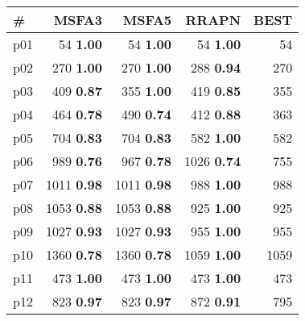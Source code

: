 \begin{tabular}{lrrrr}
\toprule
\textbf{\#} & \textbf{MSFA3} & \textbf{MSFA5} & \textbf{RRAPN} & \textbf{BEST}\\
\midrule
\multicolumn{1}{l|}{p01} & {\footnotesize 54} \textbf{1.00} & {\footnotesize 54} \textbf{1.00} & {\footnotesize 54} \textbf{1.00} & \multicolumn{1}{|r}{54}\\
\multicolumn{1}{l|}{p02} & {\footnotesize 270} \textbf{1.00} & {\footnotesize 270} \textbf{1.00} & {\footnotesize 288} \textbf{0.94} & \multicolumn{1}{|r}{270}\\
\multicolumn{1}{l|}{p03} & {\footnotesize 409} \textbf{0.87} & {\footnotesize 355} \textbf{1.00} & {\footnotesize 419} \textbf{0.85} & \multicolumn{1}{|r}{355}\\
\multicolumn{1}{l|}{p04} & {\footnotesize 464} \textbf{0.78} & {\footnotesize 490} \textbf{0.74} & {\footnotesize 412} \textbf{0.88} & \multicolumn{1}{|r}{363}\\
\multicolumn{1}{l|}{p05} & {\footnotesize 704} \textbf{0.83} & {\footnotesize 704} \textbf{0.83} & {\footnotesize 582} \textbf{1.00} & \multicolumn{1}{|r}{582}\\
\multicolumn{1}{l|}{p06} & {\footnotesize 989} \textbf{0.76} & {\footnotesize 967} \textbf{0.78} & {\footnotesize 1026} \textbf{0.74} & \multicolumn{1}{|r}{755}\\
\multicolumn{1}{l|}{p07} & {\footnotesize 1011} \textbf{0.98} & {\footnotesize 1011} \textbf{0.98} & {\footnotesize 988} \textbf{1.00} & \multicolumn{1}{|r}{988}\\
\multicolumn{1}{l|}{p08} & {\footnotesize 1053} \textbf{0.88} & {\footnotesize 1053} \textbf{0.88} & {\footnotesize 925} \textbf{1.00} & \multicolumn{1}{|r}{925}\\
\multicolumn{1}{l|}{p09} & {\footnotesize 1027} \textbf{0.93} & {\footnotesize 1027} \textbf{0.93} & {\footnotesize 955} \textbf{1.00} & \multicolumn{1}{|r}{955}\\
\multicolumn{1}{l|}{p10} & {\footnotesize 1360} \textbf{0.78} & {\footnotesize 1360} \textbf{0.78} & {\footnotesize 1059} \textbf{1.00} & \multicolumn{1}{|r}{1059}\\
\multicolumn{1}{l|}{p11} & {\footnotesize 473} \textbf{1.00} & {\footnotesize 473} \textbf{1.00} & {\footnotesize 473} \textbf{1.00} & \multicolumn{1}{|r}{473}\\
\multicolumn{1}{l|}{p12} & {\footnotesize 823} \textbf{0.97} & {\footnotesize 823} \textbf{0.97} & {\footnotesize 872} \textbf{0.91} & \multicolumn{1}{|r}{795}\\

\end{tabular}
